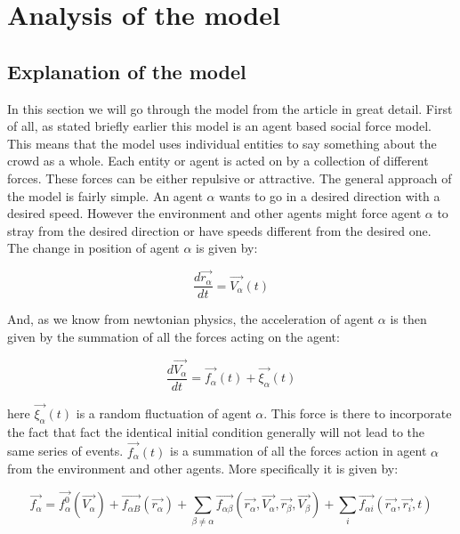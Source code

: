 \section{Analysis of the model}

\clearpage

\subsection{Explanation of the model}
In this section we will go through the model from the article \cite{self-org} in great detail. 
First of all,  as stated briefly earlier this model is an agent based social force model. 
This means that the model uses individual entities to say something about the crowd as a whole. 
Each entity or agent is acted on by a collection of different forces. These forces can be
either repulsive or attractive. The general approach of the model is fairly simple. An agent
$\alpha$ wants to go in a desired direction with a desired speed. However the environment 
and other agents might force agent $\alpha$ to stray from the desired direction or have speeds 
different from the desired one. The change in position of agent $\alpha$ is given by:

	\begin{equation}
		\frac{d \vec{r_{\alpha}}}{dt} = \vec{V_{\alpha}} \left( t \right)
	\end{equation}

And, as we know from newtonian physics, the acceleration of agent $\alpha$ is 
then given by the summation of all the forces acting on the agent:

\begin{equation}
    \frac{d \vec{V_{\alpha}}}{dt} = \vec{f_{\alpha}} \left( t \right) + 
    \vec{\xi_{\alpha}}\left( t \right)
\end{equation}

here $\vec{\xi_{\alpha}} \left( t \right)$ is a random fluctuation of agent $\alpha$. This
force is there to incorporate the fact that fact the identical initial condition
generally will not lead to the same series of events. $\vec{f_{\alpha}} \left( t \right)$ 
is a summation of all the forces action in agent $\alpha$ from the environment 
and other agents. More specifically it is given by:

\begin{equation}\label{model}
    \vec{f_{\alpha}} = \vec{f^{0}_{\alpha}}\left( \vec{V_{\alpha}} \right) + 
    \vec{f_{\alpha B}} \left( \vec{r_{\alpha}} \right) +
    \sum_{\beta \neq \alpha} \vec{f_{\alpha \beta}} \left(\vec{r_{\alpha}}, 
    \vec{V_{\alpha}}, \vec{r_{\beta}}, \vec{V_{\beta}} \right) +
    \sum_{i} \vec{f_{\alpha i}} \left( \vec{r_{\alpha}}, \vec{r_{i}}, t 
    \right)
\end{equation}

